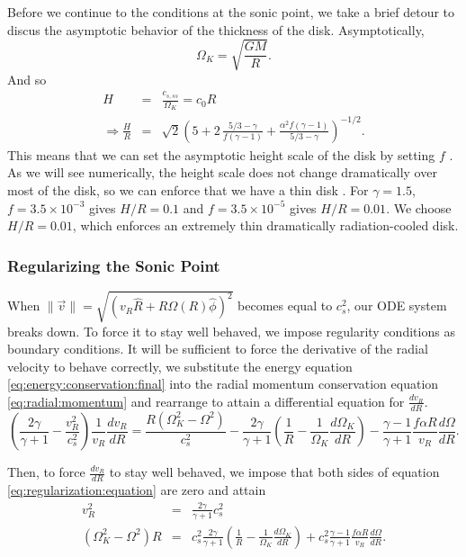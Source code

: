 \documentclass[]{article}
\newcommand{\myvec}[1]{\vec{#1}} %
\newcommand{\dR}[1]{\frac{d #1}{dR}}
\begin{document}
Before we continue to the conditions at the sonic point, we take a
brief detour to discus the asymptotic behavior of the thickness of the
disk. Asymptotically,
\begin{equation}
  \label{eq:omega:k:self-similar}
  \Omega_K = \sqrt{\frac{GM}{R}}.
\end{equation}
And so \cite{Shafee08}
\begin{eqnarray}
  \label{eq:H:R}
  H &=& \frac{c_{s,ss}}{\Omega_K} = c_0 R \nonumber\\
  \Rightarrow \frac{H}{R} &=& \sqrt{2} \left( 5+2\,{\frac {5/3-\gamma}{f \left( \gamma-1
 \right) }}+{\frac {{\alpha}^{2}f \left( \gamma-1 \right) }{5/3-\gamma
}} \right) ^{-1/2}.
\end{eqnarray}
This means that we can set the asymptotic height scale of the disk by
setting $f$ \cite{Shafee08}. As we will see numerically, the height
scale does not change dramatically over most of the disk, so we can
enforce that we have a thin disk \cite{Shafee08}. For $\gamma = 1.5$,
$f = 3.5\times 10^{-3}$ gives $H/R = 0.1$ and $f=3.5\times 10^{-5}$
gives $H/R=0.01$. We choose $H/R = 0.01$, which enforces an extremely
thin dramatically radiation-cooled disk.

\subsubsection{Regularizing the Sonic Point}
\label{subsubsec:regularizing:the:sonic:point}

When $\|\myvec{v}\| = \sqrt{\left(v_R \hat{R} + R
    \Omega(R)\hat{\phi}\right)^2}$ becomes equal to $c_s^2$, our ODE
system breaks down. To force it to stay well behaved, we impose
regularity conditions as boundary conditions. It will be sufficient to
force the derivative of the radial velocity to behave correctly, we
substitute the energy equation \eqref{eq:energy:conservation:final}
into the radial momentum conservation equation
\eqref{eq:radial:momentum} and rearrange to attain a differential
equation for $\dR{v_R}$.
\begin{equation}
  \label{eq:regularization:equation}
  \left(\frac{2\gamma}{\gamma + 1} - \frac{v_R^2}{c_s^2}\right) \frac{1}{v_R} \dR{v_R} = \frac{R(\Omega_K^2 - \Omega^2)}{c_s^2} - \frac{2\gamma}{\gamma+1}\left(\frac{1}{R} - \frac{1}{\Omega_K}\dR{\Omega_K}\right) - \frac{\gamma-1}{\gamma+1} \frac{f\alpha R}{v_R} \dR{\Omega}.
\end{equation}

Then, to force $\dR{v_R}$ to stay well behaved, we impose that both
sides of equation \eqref{eq:regularization:equation} are zero and
attain
\begin{eqnarray}
  \label{eq:regularity:1}
  v_R^2 &=& \frac{2\gamma}{\gamma + 1} c_s^2\\
  \label{eq:regularity:2}
  (\Omega_K^2 - \Omega^2)R &=& c_s^2 \frac{2\gamma}{\gamma+1}\left(\frac{1}{R} - \frac{1}{\Omega_K}\dR{\Omega_K}\right) + c_s^2 \frac{\gamma-1}{\gamma+1} \frac{f\alpha R}{v_R} \dR{\Omega}.
\end{eqnarray}
\end{document}
